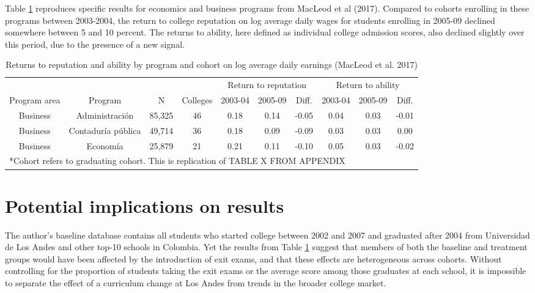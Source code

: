 \documentclass[a4paper, 11pt]{article}
\begin{document}
Table \ref{tab:macleod} reproduces specific results for economics and business programs from MacLeod et al (2017).  Compared to cohorts enrolling in these programs between 2003-2004, the return to college reputation on log average daily wages for students enrolling in 2005-09 declined somewhere between 5 and 10 percent.  The returns to ability, here defined as individual college admission scores, also declined slightly over this period, due to the presence of a new signal.   

\begin{table}[h!]
 \begin{adjustwidth}{-.75in}{-.75in} 
 \begin{center}
 \caption{Returns to reputation and ability by program and cohort on log average daily earnings (MacLeod et al. 2017)}
 \vspace{8pt}
\begin{tabular}{cccccccccc}
\toprule
             &                    &        &          & \multicolumn{3}{c}{Return to reputation}&\multicolumn{3}{c}{Return to ability}       \\
             \cmidrule(lr){5-7} \cmidrule(lr){8-10}
Program area & Program            & N      & Colleges & 2003-04              & 2005-09 & Diff. & 2003-04           & 2005-09 & Diff. \\
\midrule
Business     & Administraci\'on     & 85,325 & 46       & 0.18                 & 0.14    & -0.05 & 0.04              & 0.03    & -0.01 \\
Business     & Contadur\'ia p\'ublica & 49,714 & 36       & 0.18                 & 0.09    & -0.09 & 0.03              & 0.03    & 0.00  \\
Business     & Econom\'ia           & 25,879 & 21       & 0.21                 & 0.11    & -0.10 & 0.05              & 0.03    & -0.02 \\
\bottomrule
\multicolumn{8}{l}{\small{*Cohort refers to graduating cohort. This is replication of TABLE X FROM APPENDIX}}
\end{tabular}
\label{tab:macleod}
\end{center}
\end{adjustwidth}
\end{table}

\section*{Potential implications on results}

The author's baseline database contains all students who started college between 2002 and 2007 and graduated after 2004 from Universidad de Los Andes and other top-10 schools in Colombia.  Yet the results from Table  \ref{tab:macleod} suggest that members of both the baseline and treatment groups would have been affected by the introduction of exit exams, and that these effects are heterogeneous across cohorts.  Without controlling for the proportion of students taking the exit exams or the average score among those  graduates at each school, it is impossible to separate the effect of a curriculum change at Los Andes from trends in the broader college market.  
\end{document}
